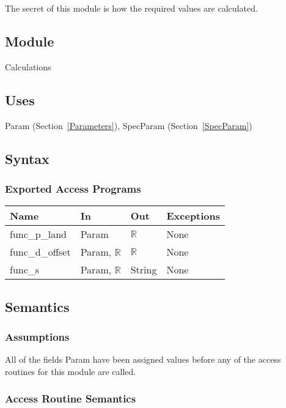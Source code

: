 \documentclass[12pt, titlepage]{article}
\begin{document}
The secret of this module is how the required values are calculated.

\subsection{Module}

Calculations

\subsection{Uses}

Param (Section~\ref{Parameters}), SpecParam (Section~\ref{SpecParam})

\subsection{Syntax}

\subsubsection{Exported Access Programs}

\begin{center}
 \begin{tabular}{p{3cm} p{3cm} p{1cm} p{8cm}}
 \hline
 \textbf{Name} & \textbf{In} & \textbf{Out} & \textbf{Exceptions} \\
 \hline
 func\_p\_land & Param & $\mathbb{R}$ & None \\
 \hline
 func\_d\_offset & Param, $\mathbb{R}$ & $\mathbb{R}$ & None \\
 \hline
 func\_s & Param, $\mathbb{R}$ & String & None \\
 \hline
 \end{tabular}
 \end{center}

\subsection{Semantics}

\subsubsection{Assumptions}

All of the fields Param have been assigned values before any of the access
 routines for this module are called.

\subsubsection{Access Routine Semantics}
\end{document}
